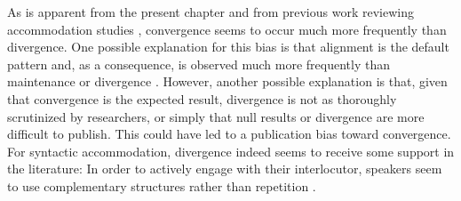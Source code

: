\documentclass[output=paper,
modfonts
]{langscibook}
\begin{document}
As is apparent from the present chapter and from previous work reviewing accommodation studies \citep{ruch_function_2018}, convergence seems to occur much more frequently than divergence. One possible explanation for this bias is that alignment is the default pattern and, as a consequence, is observed much more frequently than maintenance or divergence \citep[see][]{dijksterhuis_perception-behavior_2001}. However, another possible explanation is that, given that convergence is the expected result, divergence is not as thoroughly scrutinized by researchers, or simply that null results or divergence are more difficult to publish. This could have led to a publication bias toward convergence. For syntactic accommodation, divergence indeed seems to receive some support in the literature: In order to actively engage with their interlocutor, speakers seem to use complementary structures rather than repetition \citep{healey_divergence_2014}.
% 
% 
% 
% 
% 
%
\end{document}
